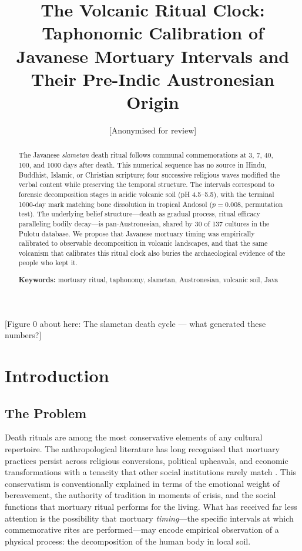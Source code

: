 \documentclass[12pt,a4paper]{article}
\title{\textbf{The Volcanic Ritual Clock: Taphonomic Calibration of Javanese Mortuary Intervals and Their Pre-Indic Austronesian Origin}}
\author{[Anonymised for review]}
\date{}
\begin{document}
\maketitle

\begin{abstract}
The Javanese \textit{slametan} death ritual follows communal commemorations at 3, 7, 40, 100, and 1000 days after death. This numerical sequence has no source in Hindu, Buddhist, Islamic, or Christian scripture; four successive religious waves modified the verbal content while preserving the temporal structure. The intervals correspond to forensic decomposition stages in acidic volcanic soil (pH 4.5--5.5), with the terminal 1000-day mark matching bone dissolution in tropical Andosol ($p = 0.008$, permutation test). The underlying belief structure---death as gradual process, ritual efficacy paralleling bodily decay---is pan-Austronesian, shared by 30 of 137 cultures in the Pulotu database. We propose that Javanese mortuary timing was empirically calibrated to observable decomposition in volcanic landscapes, and that the same volcanism that calibrates this ritual clock also buries the archaeological evidence of the people who kept it.

\medskip
\noindent\textbf{Keywords:} mortuary ritual, taphonomy, slametan, Austronesian, volcanic soil, Java
\end{abstract}

[Figure 0 about here: The slametan death cycle --- what generated these numbers?]

\bigskip

\section{Introduction}

\subsection{The Problem}

Death rituals are among the most conservative elements of any cultural repertoire. The anthropological literature has long recognised that mortuary practices persist across religious conversions, political upheavals, and economic transformations with a tenacity that other social institutions rarely match \citep{bloch_parry_1982, metcalf_huntington_1991}. This conservatism is conventionally explained in terms of the emotional weight of bereavement, the authority of tradition in moments of crisis, and the social functions that mortuary ritual performs for the living. What has received far less attention is the possibility that mortuary \textit{timing}---the specific intervals at which commemorative rites are performed---may encode empirical observation of a physical process: the decomposition of the human body in local soil.
\end{document}
